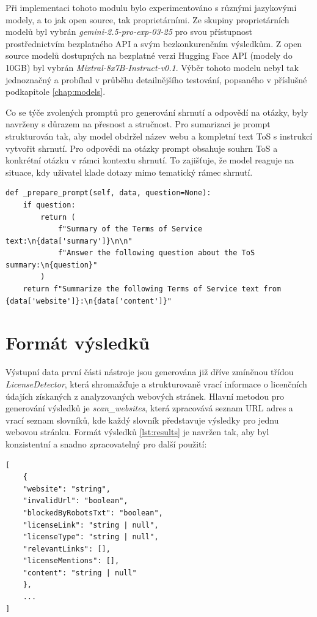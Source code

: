 Při implementaci tohoto modulu bylo experimentováno s různými jazykovými modely, a to jak open source, tak proprietárními.
Ze skupiny proprietárních modelů byl vybrán \textit{gemini-2.5-pro-exp-03-25} pro svou přístupnost prostřednictvím bezplatného API a svým bezkonkurenčním výsledkům.
Z open source modelů dostupných na bezplatné verzi Hugging Face API (modely do 10GB) byl vybrán \textit{Mixtral-8x7B-Instruct-v0.1}.
Výběr tohoto modelu nebyl tak jednoznačný a probíhal v průběhu detailnějšího testování, popsaného v příslušné podkapitole \ref{chap:models}.

Co se týče zvolených promptů pro generování shrnutí a odpovědí na otázky, byly navrženy s důrazem na přesnost a stručnost.
Pro sumarizaci je prompt strukturován tak, aby model obdržel název webu a kompletní text ToS s instrukcí vytvořit shrnutí.
Pro odpovědi na otázky prompt obsahuje souhrn ToS a konkrétní otázku v rámci kontextu shrnutí.
To zajišťuje, že model reaguje na situace, kdy uživatel klade dotazy mimo tematický rámec shrnutí.

\begin{lstlisting}[caption={Metoda \textit{prepare\_prompt} třídy BaseModel},label={lst:prompt}]
def _prepare_prompt(self, data, question=None):
    if question:
        return (
            f"Summary of the Terms of Service text:\n{data['summary']}\n\n"
            f"Answer the following question about the ToS summary:\n{question}"
        )
    return f"Summarize the following Terms of Service text from {data['website']}:\n{data['content']}"
\end{lstlisting}


\section{Formát výsledků}
\label{chap:results_format}
Výstupní data první části nástroje jsou generována již dříve zmíněnou třídou \textit{LicenseDetector}, která shromažďuje a strukturovaně vrací informace o licenčních údajích získaných z analyzovaných webových stránek.
Hlavní metodou pro generování výsledků je \textit{scan\_websites}, která zpracovává seznam URL adres a vrací seznam slovníků, kde každý slovník představuje výsledky pro jednu webovou stránku.
Formát výsledků \ref{lst:results} je navržen tak, aby byl konzistentní a snadno zpracovatelný pro další použití:

\begin{lstlisting}[caption={JSON formát výsledků},label={lst:results}]
[
    {
    "website": "string",
    "invalidUrl": "boolean",
    "blockedByRobotsTxt": "boolean",
    "licenseLink": "string | null",
    "licenseType": "string | null",
    "relevantLinks": [],
    "licenseMentions": [],
    "content": "string | null"
    },
    ...
]
\end{lstlisting}

